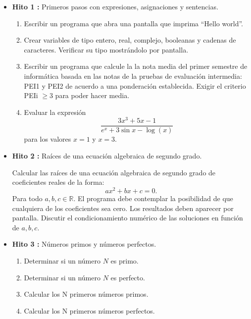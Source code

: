 \documentclass[12pt,spanish]{article}
\begin{document}
\begin{itemize}
	
	
\vspace{1cm}
\item {\bf Hito 1 :} Primeros pasos con expresiones, asignaciones y sentencias. 
\begin{enumerate} 
\item Escribir un programa  que abra una pantalla que imprima ``Hello world''. 
\item Crear variables de tipo entero, real, complejo, booleanas y
cadenas de caracteres. Verificar su tipo mostrándolo por pantalla. 
\item Escribir un programa  que calcule la la nota media del primer 
semestre de informática basada en las notas de la pruebas de evaluación intermedia: PEI1 y PEI2 
 de acuerdo a una ponderación establecida. Exigir el criterio  PEIi $ \ge 3$ para poder hacer media. 
\item Evaluar la expresión 
$$ \frac{ 3 x^3 + 5 x - 1 }{ e^x + 3 \sin x - \log(x) }
$$
para los valores $ x = 1 $ y $ x=3$.
\end{enumerate}



\vspace{1cm}
\item {\bf Hito 2 :}    Raíces de una ecuación algebraica de segundo grado. 

Calcular las raíces de una ecuación algebraica de segundo grado
de coeficientes reales de la forma: 
$$
a x^2 + b x + c = 0.
\label{ecuacion_segundo_grado}
$$
Para todo  $a, b, c \in \mathbb{R}$.
El programa debe contemplar la posibilidad de que cualquiera de los coeficientes
sea cero. Los resultados deben aparecer por pantalla. Discutir el 
condicionamiento numérico de las soluciones en función de $a, b, c $. 
 
\vspace{1cm}
\item {\bf Hito 3 :}    Números primos y números perfectos.  
\begin{enumerate} 
\item Determinar si un número $ N $ es primo. 
\item Determinar si un número $ N $ es perfecto. 
\item Calcular los N primeros números primos. 
\item Calcular los N primeros números perfectos. 
\end{enumerate}



\end{itemize}
\end{document}

